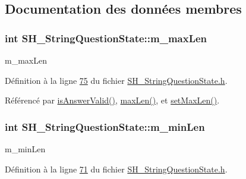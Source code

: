 \subsection{Documentation des données membres}
\hypertarget{classSH__StringQuestionState_ac001a12ae5939116282ec21920a8e7d1}{
\subsubsection[{m\-\_\-max\-Len}]{\setlength{\rightskip}{0pt plus 5cm}int S\-H\-\_\-\-String\-Question\-State\-::m\-\_\-max\-Len\hspace{0.3cm}{\ttfamily [private]}}}\label{classSH__StringQuestionState_ac001a12ae5939116282ec21920a8e7d1}


m\-\_\-max\-Len 



Définition à la ligne \hyperlink{SH__StringQuestionState_8h_source_l00075}{75} du fichier \hyperlink{SH__StringQuestionState_8h_source}{S\-H\-\_\-\-String\-Question\-State.\-h}.



Référencé par \hyperlink{classSH__StringQuestionState_a51448b87ffdb9279eaa5e7cc3ff73ce9}{is\-Answer\-Valid()}, \hyperlink{classSH__StringQuestionState_a6dce486c3484c28406b234b5f2f91288}{max\-Len()}, et \hyperlink{classSH__StringQuestionState_a7b8ca17302c0953e0ce4a5412f3b96b5}{set\-Max\-Len()}.

\hypertarget{classSH__StringQuestionState_a0efb97212b868551f4d46487fa3b0464}{
\subsubsection[{m\-\_\-min\-Len}]{\setlength{\rightskip}{0pt plus 5cm}int S\-H\-\_\-\-String\-Question\-State\-::m\-\_\-min\-Len\hspace{0.3cm}{\ttfamily [private]}}}\label{classSH__StringQuestionState_a0efb97212b868551f4d46487fa3b0464}


m\-\_\-min\-Len 



Définition à la ligne \hyperlink{SH__StringQuestionState_8h_source_l00071}{71} du fichier \hyperlink{SH__StringQuestionState_8h_source}{S\-H\-\_\-\-String\-Question\-State.\-h}.



